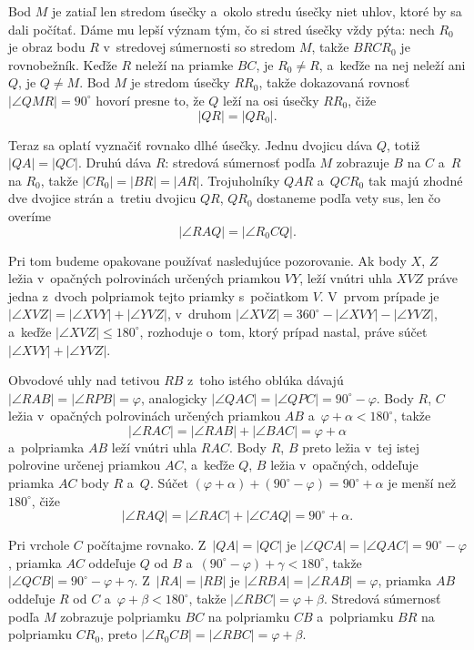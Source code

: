 {    Bod $M$ je zatiaľ len stredom úsečky a~okolo stredu úsečky niet uhlov, ktoré by sa dali počítať. Dáme mu lepší význam tým, čo si stred úsečky vždy pýta: nech $R_0$ je obraz bodu $R$ v~stredovej súmernosti so stredom $M$, takže $BRCR_0$ je rovnobežník. Keďže $R$ neleží na priamke $BC$, je $R_0 \neq R$, a~keďže na nej neleží ani $Q$, je $Q \neq M$. Bod $M$ je stredom úsečky $RR_0$, takže dokazovaná rovnosť $|\angle QMR| = 90^\circ$ hovorí presne to, že $Q$ leží na osi úsečky $RR_0$, čiže
    $$
    |QR| = |QR_0|.
    $$

    Teraz sa oplatí vyznačiť rovnako dlhé úsečky. Jednu dvojicu dáva $Q$, totiž $|QA| = |QC|$. Druhú dáva $R$: stredová súmernosť podľa $M$ zobrazuje $B$ na $C$ a~$R$ na $R_0$, takže $|CR_0| = |BR| = |AR|$. Trojuholníky $QAR$ a~$QCR_0$ tak majú zhodné dve dvojice strán a~tretiu dvojicu $QR$, $QR_0$ dostaneme podľa vety sus, len čo overíme
    $$
    |\angle RAQ| = |\angle R_0CQ|.
    $$

    Pri tom budeme opakovane používať nasledujúce pozorovanie. Ak body $X$, $Z$ ležia v~opačných polrovinách určených priamkou $VY$, leží vnútri uhla $XVZ$ práve jedna z~dvoch polpriamok tejto priamky s~počiatkom $V$. V~prvom prípade je $|\angle XVZ| = |\angle XVY| + |\angle YVZ|$, v~druhom $|\angle XVZ| = 360^\circ - |\angle XVY| - |\angle YVZ|$, a~keďže $|\angle XVZ| \leq 180^\circ$, rozhoduje o~tom, ktorý prípad nastal, práve súčet $|\angle XVY| + |\angle YVZ|$.

    Obvodové uhly nad tetivou $RB$ z~toho istého oblúka dávajú $|\angle RAB| = |\angle RPB| = \varphi$, analogicky $|\angle QAC| = |\angle QPC| = 90^\circ - \varphi$. Body $R$, $C$ ležia v~opačných polrovinách určených priamkou $AB$ a~$\varphi + \alpha < 180^\circ$, takže
    $$
    |\angle RAC| = |\angle RAB| + |\angle BAC| = \varphi + \alpha
    $$
    a~polpriamka $AB$ leží vnútri uhla $RAC$. Body $R$, $B$ preto ležia v~tej istej polrovine určenej priamkou $AC$, a~keďže $Q$, $B$ ležia v~opačných, oddeľuje priamka $AC$ body $R$ a~$Q$. Súčet $(\varphi + \alpha) + (90^\circ - \varphi) = 90^\circ + \alpha$ je menší než $180^\circ$, čiže
    $$
    |\angle RAQ| = |\angle RAC| + |\angle CAQ| = 90^\circ + \alpha.
    $$

    Pri vrchole $C$ počítajme rovnako. Z~$|QA| = |QC|$ je $|\angle QCA| = |\angle QAC| = 90^\circ - \varphi$, priamka $AC$ oddeľuje $Q$ od $B$ a~$(90^\circ - \varphi) + \gamma < 180^\circ$, takže $|\angle QCB| = 90^\circ - \varphi + \gamma$. Z~$|RA| = |RB|$ je $|\angle RBA| = |\angle RAB| = \varphi$, priamka $AB$ oddeľuje $R$ od $C$ a~$\varphi + \beta < 180^\circ$, takže $|\angle RBC| = \varphi + \beta$. Stredová súmernosť podľa $M$ zobrazuje polpriamku $BC$ na polpriamku $CB$ a~polpriamku $BR$ na polpriamku $CR_0$, preto $|\angle R_0CB| = |\angle RBC| = \varphi + \beta$.

}
